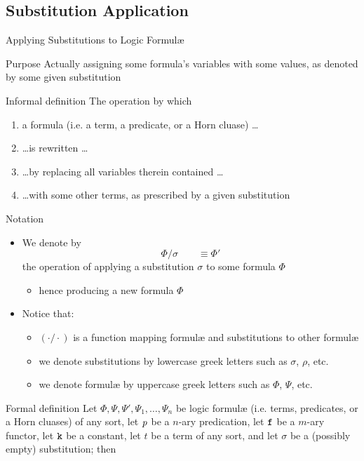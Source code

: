 \documentclass[presentation]{beamer}\mode<presentation>{\usetheme{AMSBolognaFC}}
\begin{document}
\subsection{Substitution Application}

\begin{frame}[allowframebreaks]{Applying Substitutions to Logic Formul\ae{}}
    \begin{block}{Purpose}\centering
        Actually assigning some formula's variables with some values, as denoted by some given substitution
    \end{block}
    \begin{block}{Informal definition}
        The operation by which 
		\begin{enumerate}
			\item a formula (i.e. a term, a predicate, or a Horn cluase) \ldots
			\item \ldots is \alert{rewritten} \ldots
			\item \ldots by \alert{replacing} all variables therein contained \ldots
			\item \ldots with some other \alert{terms}, as prescribed by a given \alert{substitution}
		\end{enumerate}
    \end{block}
    \begin{block}{Notation}
        \begin{itemize}
			\item We denote by 
			\[ \Phi / \sigma \qquad \equiv \Phi'\]
			the operation of applying a substitution $\sigma$ to some formula $\Phi$
			\begin{itemize}
				\item hence producing a new formula $\Phi$
			\end{itemize}

			\item Notice that:
			\begin{itemize}
				\item $(\cdot / \cdot)$ is a function mapping formul\ae{} and substitutions to other formul\ae{}
				\item we denote substitutions by lowercase greek letters such as $\sigma$, $\rho$, etc.
				\item we denote formul\ae{} by uppercase greek letters such as $\Phi$, $\Psi$, etc.
			\end{itemize} 
		\end{itemize}
    \end{block}
    \begin{alertblock}{Formal definition}
		Let $\Phi, \Psi, \Psi', \Psi_1, \ldots, \Psi_n$ be logic formul\ae{} (i.e. terms, predicates, or a Horn cluases) of any sort, 
		let $\text{\textit{p}}$ be a $n$-ary predication, let $\mathtt{f}$ be a $m$-ary functor, let $\mathtt{k}$ be a constant, let $t$ be a term of any sort,
		and let $\sigma$ be a (possibly empty) substitution;
		then
		

\end{alertblock}
\end{frame}
\end{document}
